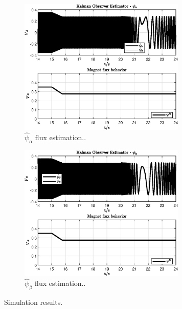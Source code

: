 \documentclass[11pt,a4paper,oneside]{book}
\numberwithin{equation}{section}
\theoremstyle{it}
\theoremstyle{definition}
\begin{document}
\begin{figure}[H]
	\centering
	\begin{subfigure}{.5\textwidth}
		\centering
		\includegraphics[width = 225pt, angle=0, 
		keepaspectratio]{figures/mpc/observerPSIa.eps}
		\captionsetup{width=.5\textwidth}
		\caption{$\hat{\psi}_\alpha$ flux estimation..}
		\label{}
	\end{subfigure}%
	\begin{subfigure}{.5\textwidth}
		\centering
		\includegraphics[width = 225pt, angle=0, 
		keepaspectratio]{figures/mpc/observerPSIb.eps}
		\captionsetup{width=.5\textwidth}
		\caption{$\hat{\psi}_\beta$ flux estimation..}
		\label{}
	\end{subfigure}
	\caption{Simulation results.}
	\label{}
\end{figure}
\end{document}

